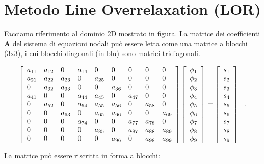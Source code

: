 \section{Metodo Line Overrelaxation (LOR)}

Facciamo riferimento al dominio 2D mostrato in figura. La matrice dei coefficienti \(\mathbf{A}\) del sistema di equazioni nodali può essere letta come una matrice a blocchi (3x3), i cui blocchi diagonali (in blu) sono matrici tridiagonali.

\[
\left[ \begin{array}{l l l l l l l l l}
	a_{11} & a_{12} & 0 & a_{14} & 0 & 0 & 0 & 0 & 0 \\
	a_{21} & a_{22} & a_{23} & 0 & a_{25} & 0 & 0 & 0 & 0 \\
	0 & a_{32} & a_{33} & 0 & 0 & a_{36} & 0 & 0 & 0 \\
	a_{41} & 0 & 0 & a_{44} & a_{45} & 0 & a_{47} & 0 & 0 \\
	0 & a_{52} & 0 & a_{54} & a_{55} & a_{56} & 0 & a_{58} & 0 \\
	0 & 0 & a_{63} & 0 & a_{65} & a_{66} & 0 & 0 & a_{69} \\
	0 & 0 & 0 & a_{74} & 0 & 0 & a_{77} & a_{78} & 0 \\
	0 & 0 & 0 & 0 & a_{85} & 0 & a_{87} & a_{88} & a_{89} \\
	0 & 0 & 0 & 0 & 0 & a_{96} & 0 & a_{98} & a_{99}
\end{array} \right]
\left[ \begin{array}{l}
	\phi_1 \\ \phi_2 \\ \phi_3 \\ \phi_4 \\ \phi_5 \\ \phi_6 \\ \phi_7 \\ \phi_8 \\ \phi_9
\end{array} \right]
=
\left[ \begin{array}{l}
	s_1 \\ s_2 \\ s_3 \\ s_4 \\ s_5 \\ s_6 \\ s_7 \\ s_8 \\ s_9
\end{array} \right]\ \ . 
\]

La matrice può essere riscritta in forma a blocchi:

